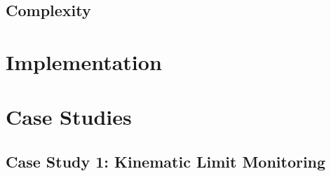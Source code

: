 \documentclass[runningheads]{llncs}
\begin{document}
\subsection{Complexity}

\section{Implementation}
\label{sec:impl}


\section{Case Studies}
\label{sec:cases}

\subsection{Case Study 1: Kinematic Limit Monitoring}
\end{document}
